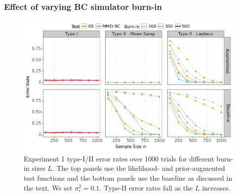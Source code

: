 \subsubsection{Effect of varying BC simulator burn-in}
\begin{figure}[H]
    \centering
    \includegraphics[width=\textwidth]{figures/results_1b.png}
    \caption{Experiment 1 type-I/II error rates over 1000 trials for different burn-in sizes $L$. The top panels use the likelihood- and prior-augmented test functions and the bottom panels use the baseline as discussed in the text. We set $\sigma_{\epsilon}^{2}=0.1$. Type-II error rates fall as the $L$ increases.}
    \label{fig:ex2b}
\end{figure}


